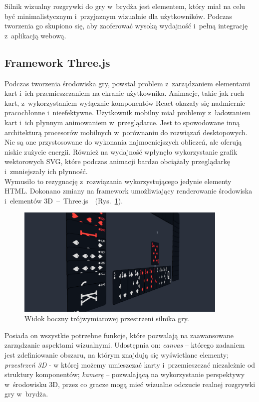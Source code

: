 Silnik wizualny rozgrywki do gry w~brydża jest elementem, który miał na celu
być minimalistycznym i~przyjaznym wizualnie dla użytkowników.
Podczas tworzenia go skupiono się, aby zaoferować
wysoką wydajność i~pełną integrację z~aplikacją webową.


\subsection{Framework Three.js}

Podczas tworzenia środowiska gry, powstał problem z~zarządzaniem
elementami kart i~ich przemieszczaniem na ekranie użytkownika. Animacje,
takie jak ruch kart, z~wykorzystaniem wyłącznie komponentów React
okazały się nadmiernie pracochłonne i~nieefektywne. Użytkownik
mobilny miał problemy z~ładowaniem kart
i~ich płynnym animowaniem w~przeglądarce. Jest to spowodowane inną architekturą procesorów
mobilnych w~porównaniu do rozwiązań desktopowych. Nie są one przystosowane
do wykonania najmocniejszych obliczeń, ale oferują niskie zużycie energii.
Również na wydajność wpłynęło wykorzystanie grafik wektorowych SVG,
które podczas animacji bardzo obciążały przeglądarkę i~zmniejszały
ich płynność. \\

Wymusiło to rezygnację z~rozwiązania wykorzystującego jedynie elementy HTML.
Dokonano zmiany na framework umożliwiający renderowanie
środowiska i~elementów
\mbox{3D -- Three.js~\cite{ThreeJS}~(Rys.~\ref{fig:engine_orbit})}.

\begin{figure}[hbt!]
  \centering
  \includegraphics[width=0.9\textwidth]{img/bridge-engine/orbit.png}
  \caption{Widok boczny trójwymiarowej przestrzeni silnika gry.}
  \label{fig:engine_orbit}
\end{figure}

Posiada on wszystkie potrzebne funkcje, które pozwalają na zaawansowane
zarządzanie aspektami wizualnymi. Udostępnia on:
\textit{canvas} -- którego zadaniem jest zdefiniowanie
obszaru, na którym znajdują się wyświetlane elementy;
\textit{przestrzeń 3D} - w której możemy umieszczać
karty i~przemieszczać niezależnie od struktury komponentów;
\textit{kamerę} -- pozwalającą na wykorzystanie perspektywy
w~środowisku 3D, przez co gracze mogą mieć wizualne
odczucie realnej rozgrywki gry w~brydża.

